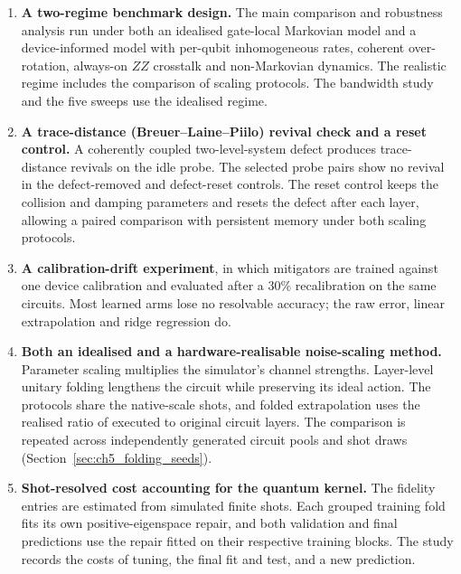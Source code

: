 \documentclass[Thesis.tex]{subfiles}
\begin{document}
\begin{enumerate}
    \item \textbf{A two-regime benchmark design.} The main comparison and
    robustness analysis run under both an idealised gate-local Markovian model
    and a device-informed model with per-qubit inhomogeneous rates, coherent
    over-rotation, always-on $ZZ$ crosstalk and non-Markovian dynamics.
    The realistic regime includes the comparison of scaling protocols.
    The bandwidth study and the five sweeps use the idealised regime.

    \item \textbf{A trace-distance (Breuer--Laine--Piilo) revival check and a reset control.}
    A coherently coupled two-level-system defect produces trace-distance revivals
    on the idle probe. The selected probe pairs show no revival in the
    defect-removed and defect-reset controls. The reset control keeps the
    collision and damping parameters and resets the defect after each layer,
    allowing a paired comparison with persistent memory under both scaling
    protocols.

    \item \textbf{A calibration-drift experiment}, in which mitigators are trained
    against one device calibration and evaluated after a $30\%$ recalibration on the
    same circuits. Most learned arms lose no resolvable accuracy; the raw error,
    linear extrapolation and ridge regression do.

    \item \textbf{Both an idealised and a hardware-realisable noise-scaling method.}
    Parameter scaling multiplies the simulator's channel strengths. Layer-level
    unitary folding lengthens the circuit while preserving its ideal action.
    The protocols share the native-scale shots, and folded extrapolation uses
    the realised ratio of executed to original circuit layers. The comparison
    is repeated across independently generated circuit pools and shot draws
    (Section~\ref{sec:ch5_folding_seeds}).

    \item \textbf{Shot-resolved cost accounting for the quantum kernel.} The fidelity
    entries are estimated from simulated finite shots. Each grouped training fold
    fits its own positive-eigenspace repair, and both validation and final
    predictions use the repair fitted on their respective training blocks.
    The study records the costs of tuning, the final fit and test, and a new
    prediction.


\end{enumerate}
\end{document}
